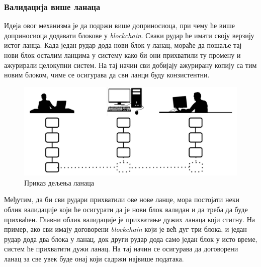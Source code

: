 \documentclass[12pt, a4paper]{article}
\begin{document}
\newpage
\subsubsection{Валидација више ланаца}
Идеја овог механизма је да подржи више доприносиоца, при чему ће више доприносиоца додавати блокове у \textit{blockchain}. Сваки рудар ће имати своју верзију истог ланца. Када један рудар дода нови блок у ланац, мораће да пошаље тај нови блок осталим ланцима у систему како би они прихватили ту промену и ажурирали целокупни систем. На тај начин сви добијају ажурирану копију са тим новим блоком, чиме се осигурава да сви ланци буду конзистентни.


\begin{figure}[h]
    \centering
    \includegraphics[width=1\linewidth]{slike/multiple-chain-validation.png}
    \caption{Приказ дељења ланаца}
    \label{fig:multiple-chain-validation}
\end{figure}

Међутим, да би сви рудари прихватили ове нове ланце, мора постојати неки облик валидације који ће осигурати да је нови блок валидан и да треба да буде прихваћен. Главни облик валидације је прихватање дужих ланаца који стигну. На пример, ако сви имају договорени \textit{blockchain} који је већ дуг три блока, и један рудар дода два блока у ланац, док други рудар дода само један блок у исто време, систем ће прихватити дужи ланац. На тај начин се осигурава да договорени ланац за све увек буде онај који садржи највише података.
\end{document}
